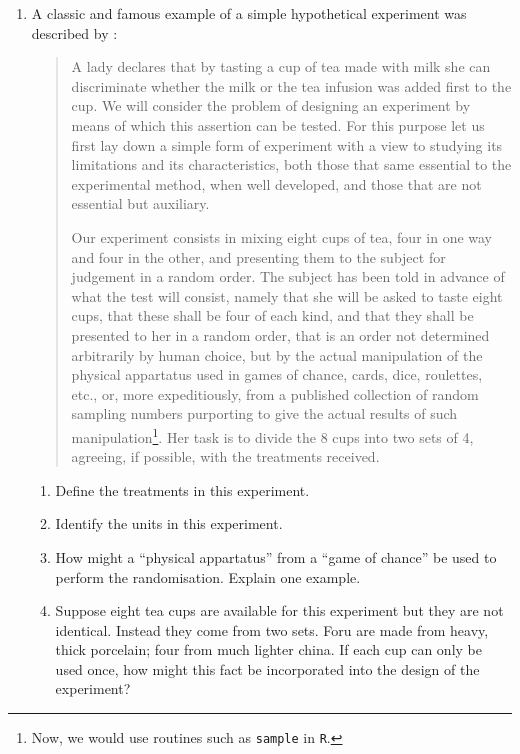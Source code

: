 \documentclass[
]{book}
\providecommand{\tightlist}{%
  \setlength{\itemsep}{0pt}\setlength{\parskip}{0pt}}
\theoremstyle{definition}
\theoremstyle{definition}
\theoremstyle{definition}
\theoremstyle{definition}
\theoremstyle{remark}
\begin{document}
\begin{enumerate}
\def\labelenumi{\arabic{enumi}.}
\item
  \citep[Adapted from][]{Morris2011} A classic and famous example of a simple hypothetical experiment was described by \citet{Fisher1935}:

  \begin{quote}
  A lady declares that by tasting a cup of tea made with milk she can discriminate whether the milk or the tea infusion was added first to the cup. We will consider the problem of designing an experiment by means of which this assertion can be tested. For this purpose let us first lay down a simple form of experiment with a view to studying its limitations and its characteristics, both those that same essential to the experimental method, when well developed, and those that are not essential but auxiliary.

  Our experiment consists in mixing eight cups of tea, four in one way and four in the other, and presenting them to the subject for judgement in a random order. The subject has been told in advance of what the test will consist, namely that she will be asked to taste eight cups, that these shall be four of each kind, and that they shall be presented to her in a random order, that is an order not determined arbitrarily by human choice, but by the actual manipulation of the physical appartatus used in games of chance, cards, dice, roulettes, etc., or, more expeditiously, from a published collection of random sampling numbers purporting to give the actual results of such manipulation\footnote{Now, we would use routines such as \texttt{sample} in \texttt{R}.}. Her task is to divide the 8 cups into two sets of 4, agreeing, if possible, with the treatments received.
  \end{quote}

  \begin{enumerate}
  \def\labelenumii{\alph{enumii}.}
  \tightlist
  \item
    Define the treatments in this experiment.
  \item
    Identify the units in this experiment.
  \item
    How might a ``physical appartatus'' from a ``game of chance'' be used to perform the randomisation. Explain one example.
  \item
    Suppose eight tea cups are available for this experiment but they are not identical. Instead they come from two sets. Foru are made from heavy, thick porcelain; four from much lighter china. If each cup can only be used once, how might this fact be incorporated into the design of the experiment?
  \end{enumerate}
\end{enumerate}
\end{document}
